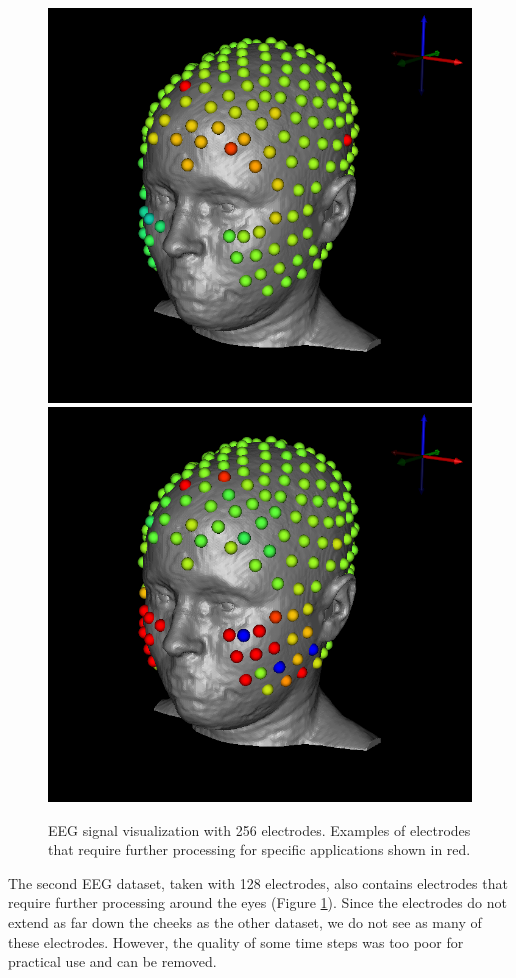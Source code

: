 \begin{figure}[H]
\begin{center}
\includegraphics[width=.49\textwidth]{Figures/eeg_1}
\includegraphics[width=.49\textwidth]{Figures/eeg_2}
\caption{EEG signal visualization with 256 electrodes. Examples of electrodes that require further processing for specific applications shown in red.}
\label{fig:eegvis}
\end{center}
\end{figure}

The second EEG dataset, taken with 128 electrodes, also contains electrodes that require further processing around the eyes (Figure \ref{fig:eegvis}). Since the electrodes do not extend as far down the cheeks as the other dataset, we do not see as many of these electrodes. However, the quality of some time steps was too poor for practical use and can be removed.

